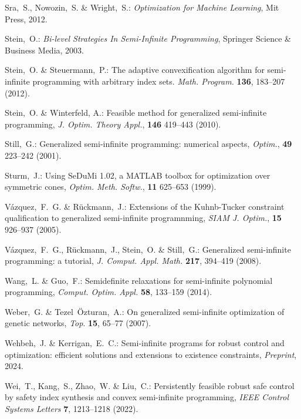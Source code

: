 \documentclass{amsart}
\theoremstyle{plain}
\numberwithin{equation}{section}
\begin{document}
\begin{thebibliography}{100}
			
			Sra,~S., Nowozin,~S. \& Wright,~S.: 
			{\em Optimization for Machine Learning}, 
			Mit Press, 2012.
			
			Stein,~O.: 
			{\em Bi-level Strategies In Semi-Infinite Programming},
			Springer Science \& Business Media, 2003.
			
			Stein,~O. \& Steuermann,~P.: 
			The adaptive convexification algorithm for semi-infinite programming with arbitrary index sets. 
			{\em Math. Program.} \textbf{136}, 183--207 (2012).
			
			
			
			Stein,~O. \& Winterfeld, A.: 
			Feasible method for generalized semi-infinite programming,
			{\em J. Optim. Theory Appl.}, {\bf 146} 419--443 (2010).
			
			Still,~G.:
			Generalized semi-infinite programming: numerical aspects,
			{\em Optim.}, {\bf 49} 223--242 (2001).
			
			Sturm,~J.:
			Using SeDuMi 1.02, a MATLAB toolbox for optimization over symmetric cones,
			\emph{Optim. Meth. Softw.}, \textbf{11} 625--653 (1999).
			
			V\'{a}zquez,~F.~G. \& R\"{u}ckmann,~J.:
			Extensions of the Kuhnb-Tucker constraint qualification to generalized semi-infinite programnming,
			{\em SIAM J. Optim.}, {\bf 15} 926--937 (2005).
			
			V\'{a}zquez,~F.~G., R\"{u}ckmann,~J., Stein,~O. \& Still,~G.: 
			Generalized semi-infinite programming: a tutorial, 
			{\em J. Comput. Appl. Math.} \textbf{217}, 394--419 (2008).
			
			
			Wang,~L. \& Guo,~F.: 
			Semidefinite relaxations for semi-infinite polynomial programming,
			{\em Comput. Optim. Appl.} \textbf{58}, 133--159 (2014).
			
			
			Weber,~G. \& Tezel~\"{O}zturan,~A.: 
			On generalized semi-infinite optimization of genetic networks,
			{\em Top}. \textbf{15}, 65--77 (2007).
			
			Wehbeh,~J. \& Kerrigan,~E.~C.:
			Semi-infinite programs for robust control and optimization: 
			efficient solutions and extensions to existence constraints,
			{\em Preprint}, 2024.
			
			Wei,~T., Kang,~S., Zhao,~W. \& Liu,~C.: 
			Persistently feasible robust safe control by safety index synthesis and convex semi-infinite programming, 
			{\em IEEE Control Systems Letters} \textbf{7}, 1213--1218 (2022).
			

\end{thebibliography}
\end{document}
